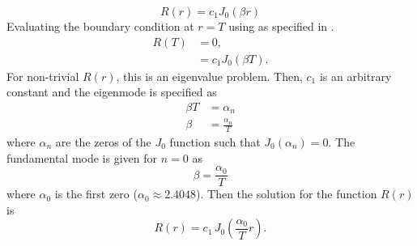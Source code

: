   \begin{equation}
    \label{eq:finite_cyl_j0}
    R(r) = c_1 J_0(\beta r)
  \end{equation}
  Evaluating the boundary condition at $r=T$ using  as
  specified in .
  \begin{align}
    R(T) &= 0, \\
    &= c_1 J_0(\beta T).
  \end{align}
  For non-trivial $R(r)$, this is an eigenvalue problem. Then, $c_1$ is an
  arbitrary constant and the eigenmode is specified as
  \begin{align}
    \beta T &= \alpha_n \\
    \beta &= \frac{\alpha_n}{T} 
  \end{align}
  where $\alpha_n$ are the zeros of the $J_0$ function such that $J_0(\alpha_n)
  = 0$. The fundamental mode is given for $n=0$ as
  \begin{equation}
    \label{eq:finite_cyl_beta}
    \beta = \frac{\alpha_0}{T}
  \end{equation}
  where $\alpha_0$ is the first zero ($\alpha_0 \approx 2.4048$).  Then the
  solution for the function $R(r)$ is
  \begin{equation}
    \label{eq:finite_cyl_R}
    R(r) = c_1 \, J_0\left(\frac{\alpha_0}{T} r\right).
  \end{equation}

